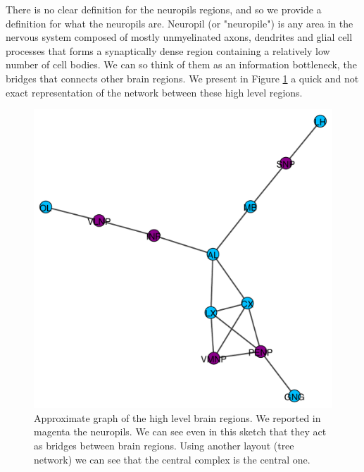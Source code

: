 There is no clear definition for the neuropils regions, and so we provide
a definition for what the neuropils are. Neuropil (or "neuropile") is any area 
in the nervous system composed of mostly unmyelinated axons, dendrites and glial 
cell processes that forms a synaptically dense region containing a relatively low 
number of cell bodies. We can so think of them as an information bottleneck, the bridges
that connects other brain regions.
We present in Figure \ref{fig:high_lvl} a quick and not exact representation of the network between these high level
regions.
\begin{figure}[h]
    \centering
    \includegraphics[width=\textwidth]{Images/high_lvl_brain.pdf}
    \caption{Approximate graph of the high level brain regions. We reported
    in magenta the neuropils. We can see even in this sketch that they act as bridges 
    between brain regions. Using another layout (tree network) we can see that the central
    complex is the central one.}
    \label{fig:high_lvl}
\end{figure}
